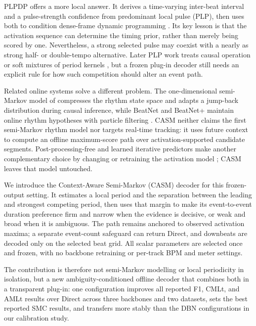 \documentclass{article}
\begin{document}
PLPDP offers a more local answer. It derives a time-varying inter-beat interval
and a pulse-strength confidence from predominant local pulse (PLP), then uses
both to condition dense-frame dynamic programming
\cite{chiu2023localperiodicity}. Its key lesson is that the activation sequence
can determine the timing prior, rather than merely being scored by one.
Nevertheless, a strong selected pulse may coexist with a nearly as strong
half- or double-tempo alternative. Later PLP work treats causal operation or
soft mixtures of period kernels \cite{meier2024realtime,chiu2025dplp}, but a
frozen plug-in decoder still needs an explicit rule for how such competition
should alter an event path.

Related online systems solve a different problem. The one-dimensional
semi-Markov model of \cite{heydari2022semimarkov} compresses the rhythm state
space and adapts a jump-back distribution during causal inference, while
BeatNet and BeatNet+ maintain online rhythm hypotheses with particle filtering
\cite{heydari2021beatnet,heydari2024beatnetplus}. CASM neither claims the first
semi-Markov rhythm model nor targets real-time tracking: it uses future context
to compute an offline maximum-score path over activation-supported candidate
segments. Post-processing-free and learned iterative predictors make another
complementary choice by changing or retraining the activation model
\cite{chen2022postprocessingfree,foscarin2024beat,foscarin2026masked}; CASM
leaves that model untouched.

We introduce the Context-Aware Semi-Markov (CASM) decoder for this frozen-output
setting. It estimates a local period and the separation between the leading and
strongest competing period, then uses that margin to make its event-to-event
duration preference firm and narrow when the evidence is decisive, or weak and
broad when it is ambiguous. The path remains anchored to observed activation
maxima; a separate event-count safeguard can return Direct, and downbeats are
decoded only on the selected beat grid. All scalar parameters are selected once
and frozen, with no backbone retraining or per-track BPM and meter settings.

The contribution is therefore not semi-Markov modelling or local periodicity
in isolation, but a new ambiguity-conditioned offline decoder that combines
both in a transparent plug-in: one configuration improves all reported F1,
CMLt, and AMLt results over Direct across three backbones and two datasets,
sets the best reported SMC results, and transfers more stably than the DBN
configurations in our calibration study.
\end{document}
